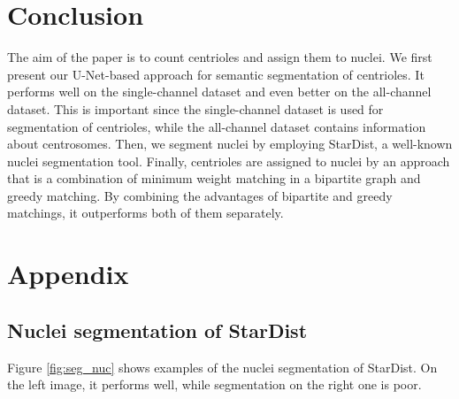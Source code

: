 \documentclass[9pt,conference,compsocconf, article]{IEEEtran}
\begin{document}
\section{Conclusion}

The aim of the paper is to count centrioles and assign them to nuclei. We first present our U-Net-based approach for semantic segmentation of centrioles. It performs well on the single-channel dataset and even better on the all-channel dataset. This is important since the single-channel dataset is used for segmentation of centrioles, while the all-channel dataset contains information about centrosomes. Then, we segment nuclei by employing StarDist, a well-known nuclei segmentation tool. Finally, centrioles are assigned to nuclei by an approach that is a combination of minimum weight matching in a bipartite graph and greedy matching. By combining the advantages of bipartite and greedy matchings, it outperforms both of them separately.

\pagebreak




\clearpage
\section{Appendix}
\label{sec:appendix}
\subsection{Nuclei segmentation of StarDist}
Figure \ref{fig:seg_nuc} shows examples of the nuclei segmentation of StarDist. On the left image, it performs well, while segmentation on the right one is poor.
\end{document}
